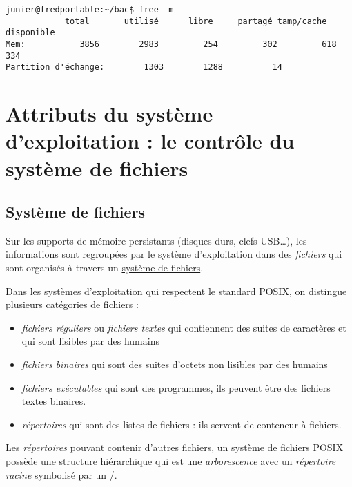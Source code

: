 \documentclass[
  11pt,
]{article}
\providecommand{\tightlist}{%
  \setlength{\itemsep}{0pt}\setlength{\parskip}{0pt}}
\newcounter{prog}
\begin{document}
\begin{verbatim}
junier@fredportable:~/bac$ free -m
            total       utilisé      libre     partagé tamp/cache   disponible
Mem:           3856        2983         254         302         618         334
Partition d'échange:        1303        1288          14
\end{verbatim}

\hypertarget{attributs-du-systuxe8me-dexploitation-le-contruxf4le-du-systuxe8me-de-fichiers}{%
\section{Attributs du système d'exploitation : le contrôle du système de
fichiers}\label{attributs-du-systuxe8me-dexploitation-le-contruxf4le-du-systuxe8me-de-fichiers}}

\hypertarget{systuxe8me-de-fichiers}{%
\subsection{Système de fichiers}\label{systuxe8me-de-fichiers}}

Sur les supports de mémoire persistants (disques durs, clefs
USB\ldots{}), les informations sont regroupées par le système
d'exploitation dans des \emph{fichiers} qui sont organisés à travers un
\href{https://fr.wikipedia.org/wiki/Syst\%C3\%A8me_de_fichiers}{système
de fichiers}.

Dans les systèmes d'exploitation qui respectent le standard
\href{https://fr.wikipedia.org/wiki/POSIX}{POSIX}, on distingue
plusieurs catégories de fichiers :

\begin{itemize}
\tightlist
\item
  \emph{fichiers réguliers} ou \emph{fichiers textes} qui contiennent
  des suites de caractères et qui sont lisibles par des humains
\item
  \emph{fichiers binaires} qui sont des suites d'octets non lisibles par
  des humains
\item
  \emph{fichiers exécutables} qui sont des programmes, ils peuvent être
  des fichiers textes binaires.
\item
  \emph{répertoires} qui sont des listes de fichiers : ils servent de
  conteneur à fichiers.
\end{itemize}

Les \emph{répertoires} pouvant contenir d'autres fichiers, un système de
fichiers \href{https://fr.wikipedia.org/wiki/POSIX}{POSIX} possède une
structure hiérarchique qui est une \emph{arborescence} avec un
\emph{répertoire racine} symbolisé par un /.
\end{document}
